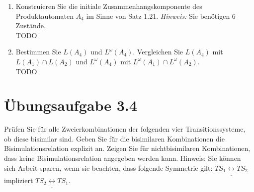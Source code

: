 \documentclass[a4paper]{scrartcl}
\begin{document}
\begin{enumerate}[1.]
    \item Konstruieren Sie die initiale Zusammenhangskomponente des Produktautomaten 
        $A_4$ im Sinne von Satz 1.21. \textit{Hinweis:} Sie benötigen 6 Zustände. \\
        TODO

    \item Bestimmen Sie $L(A_4)$ und $L^{\omega}(A_4)$. Vergleichen Sie $L(A_4)$ mit 
        $L(A_1) \cap L(A_2)$ und $L^{\omega}(A_4)$ mit $L^{\omega}(A_1) \cap L^{\omega}(A_2)$. \\
        TODO

\end{enumerate}
\section*{Übungsaufgabe 3.4}
Prüfen Sie für alle Zweierkombinationen der folgenden vier Transitionssysteme, ob 
diese bisimilar sind. Geben Sie für die bisimilaren Kombinationen die 
Bisimulationsrelation explizit an. Zeigen Sie für nichtbisimilaren Kombinationen, 
dass keine Bisimulationsrelation angegeben werden kann. Hinweis: Sie können sich 
Arbeit sparen, wenn sie beachten, dass folgende Symmetrie gilt: 
$TS_1 \underline{\leftrightarrow} TS_2$ impliziert $TS_2 \underline{\leftrightarrow} TS_1$.
\end{document}
